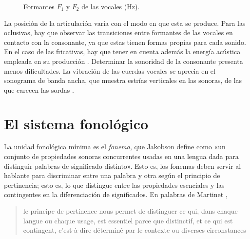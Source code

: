 \begin{figure}[!ht]
	\centering\small
	
	\caption{Formantes $F_1$ y $F_2$ de las vocales (Hz).}
	\label{fig:formantvocales}
\end{figure}	

La posición de la articulación varía con el  modo en que esta se produce. Para las oclusivas, hay que observar las transiciones entre formantes de las vocales en contacto con la consonante, ya que estas tienen formas propias para cada sonido. En el caso de las fricativas, hay que tener en cuenta además la energía acústica empleada en su producción \parencite[102]{clegg2018}. Determinar la sonoridad de la consonante presenta menos dificultades. La vibración de las cuerdas vocales se aprecia en el sonograma de banda ancha, que muestra estrías verticales en las sonoras, de las que carecen las sordas \parencite[102]{clegg2018}. 






\section{El sistema fonológico}
La unidad fonológica mínima es el \textit{fonema}, que Jakobson \parencite*[231]{jakobson1962a} define como «un conjunto de propiedades sonoras concurrentes usadas en una lengua dada para distinguir palabras de significado distinto». Esto es, los fonemas deben servir al hablante para discriminar entre una palabra y otra según el principio de pertinencia; esto es, lo que distingue entre las propiedades esenciales y las contingentes en la diferenciación de significados. En palabras de Martinet \parencite*[45]{martinet1970}, \blockquote{le principe de pertinence nous permet de distinguer ce	qui, dans chaque langue ou chaque usage, est essentiel parce que distinctif, et ce qui est contingent, c'est-à-dire déterminé par le contexte ou diverses circonstances}.

